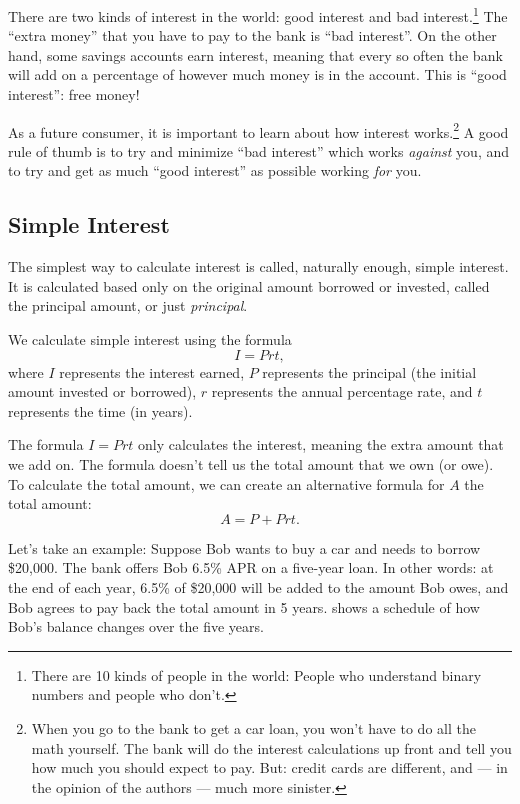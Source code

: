 There are two kinds of interest in the world: good interest and bad interest.\footnote{There are 10 kinds of people in the world: People who understand binary numbers and people who don't.} The ``extra money'' that you have to pay to the bank is ``bad interest''. On the other hand, some savings accounts earn interest, meaning that every so often the bank will add on a percentage of however much money is in the account. This is ``good interest'': free money!

As a future consumer, it is important to learn about how interest works.\footnote{When you go to the bank to get a car loan, you won't have to do all the math yourself. The bank will do the interest calculations up front and tell you how much you should expect to pay. But: credit cards are different, and --- in the opinion of the authors --- much more sinister.} A good rule of thumb is to try and minimize ``bad interest'' which works \textit{against} you, and to try and get as much ``good interest'' as possible working \textit{for} you.

\subsection{Simple Interest}

The simplest way to calculate interest is called, naturally enough, \gls{simple interest}. It is calculated based only on the original amount borrowed or invested, called the \gls{principal amount}, or just \textit{principal}.

\begin{boxeddef}
We calculate simple interest using the formula \[I = Prt,\] where $I$ represents the interest earned, $P$ represents the principal (the initial amount invested or borrowed), $r$ represents the annual percentage rate, and $t$ represents the time (in years).
\end{boxeddef}

The formula $I=Prt$ only calculates the interest, meaning the extra amount that we add on. The formula doesn't tell us the total amount that we own (or owe). To calculate the total amount, we can create an alternative formula for $A$ the total amount: \[A = P +Prt.\]

Let's take an example: Suppose Bob wants to buy a car and needs to borrow \$20,000. The bank offers Bob 6.5\% APR on a five-year loan. In other words: at the end of each year, 6.5\% of \$20,000 will be added to the amount Bob owes, and Bob agrees to pay back the total amount in 5 years.  shows a schedule of how Bob's balance changes over the five years.

